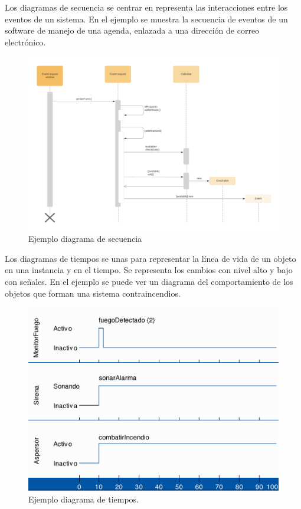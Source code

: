\documentclass[a4paper, 12pt]{book}
\begin{document}
Los diagramas de secuencia se centrar en representa las interacciones entre los eventos de un sistema. En el ejemplo se muestra la secuencia de eventos de un software de manejo de una agenda, enlazada a una dirección de correo electrónico.
\begin{figure}
	\centering
	\includegraphics[width=14cm, keepaspectratio]{img/diagrama_secuencia.png}
	\caption{Ejemplo diagrama de secuencia}\label{fig:diagrama_secuencia}
\end{figure}

Los diagramas de tiempos se unas para representar la línea de vida de un objeto en una instancia y en el tiempo. Se representa los cambios con nivel alto y bajo con señales. En el ejemplo se puede ver un diagrama del comportamiento de los objetos que forman una sistema contraincendios.
\begin{figure}
	\centering
	\includegraphics[width=12cm, keepaspectratio]{img/diagrama_tiempos.png}
	\caption{Ejemplo diagrama de tiempos.}\label{fig:diagrama_tiempos}
\end{figure}



\cleardoublepage


\end{document}
